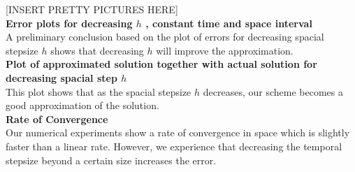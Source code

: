 [INSERT PRETTY PICTURES HERE]\\

\textbf{Error plots for decreasing $h$ , constant time and space interval}\\
A preliminary conclusion based on the plot of errors for decreasing spacial stepsize $h$ shows that decreasing $h$ will improve the approximation.\\

\textbf{Plot of approximated solution together with actual solution for decreasing spacial step $h$}\\
This plot shows that as the spacial stepsize $h$ decreases, our scheme becomes a good approximation of the solution. \\

\textbf{Rate of Convergence}\\
Our numerical experiments show a rate of convergence in space which is slightly faster than a linear rate. However, we experience that decreasing the temporal stepsize beyond a certain size increases the error. 
